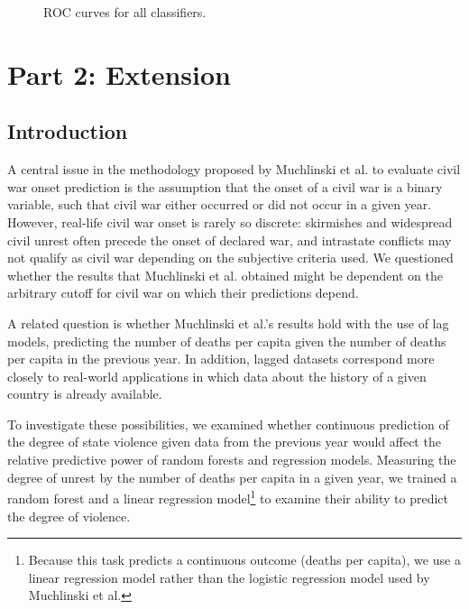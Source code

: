 \documentclass{article}
\begin{document}
\begin{figure}[H]
    \caption{ROC curves for all classifiers.}
\label{fig:f1}
\end{figure}

\newpage

\section*{Part 2: Extension}
\subsection*{Introduction}
A central issue in the methodology proposed by Muchlinski et al. to evaluate civil war onset prediction is the assumption that the onset of a civil war is a binary variable, such that civil war either occurred or did not occur in a given year. However, real-life civil war onset is rarely so discrete: skirmishes and widespread civil unrest often precede the onset of declared war, and intrastate conflicts may not qualify as civil war depending on the subjective criteria used. We questioned whether the results that Muchlinski et al. obtained might be dependent on the arbitrary cutoff for civil war on which their predictions depend.

A related question is whether Muchlinski et al.'s results hold with the use of lag models, predicting the number of deaths per capita given the number of deaths per capita in the previous year. In addition, lagged datasets correspond more closely to real-world applications in which data about the history of a given country is already available.

To investigate these possibilities, we examined whether continuous prediction of the degree of state violence given data from the previous year would affect the relative predictive power of random forests and regression models. Measuring the degree of unrest by the number of deaths per capita in a given year, we trained a random forest and a linear regression model\footnote{Because this task predicts a continuous outcome (deaths per capita), we use a linear regression model rather than the logistic regression model used by Muchlinski et al.} to examine their ability to predict the degree of violence.
\end{document}
